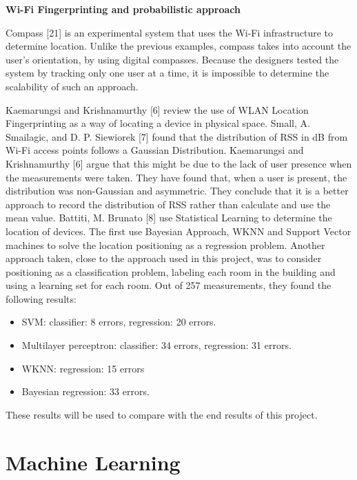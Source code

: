 \medskip
\noindent \textbf{Wi-Fi Fingerprinting and probabilistic approach}

Compass [21] is an experimental system that uses the Wi-Fi infrastructure to determine location. Unlike the previous examples, compass takes into account the user’s orientation, by using digital compasses. Because the designers tested the system by tracking only one user at a time, it is impossible to determine the scalability of such an approach.

Kaemarungsi and Krishnamurthy [6] review the use of WLAN Location Fingerprinting as a way of locating a device in physical space. Small, A. Smailagic, and D. P. Siewiorek [7] found that the distribution of RSS in dB from Wi-Fi access points follows a Gaussian Distribution. Kaemarungsi and Krishnamurthy [6] argue that this might be due to the lack of user presence when the measurements were taken. They have found that, when a user is present, the distribution was non-Gaussian and asymmetric. They conclude that it is a better approach to record the distribution of RSS rather than calculate and use the mean value. 
Battiti, M. Brunato [8] use Statistical Learning to determine the location of devices. The first use Bayesian Approach, WKNN and Support Vector machines to solve the location positioning as a regression problem. Another approach taken, close to the approach used in this project, was to consider positioning as a classification problem, labeling each room in the building and using a learning set for each room. Out of 257 measurements, they found the following results:
\begin{itemize}
\item SVM: classifier: 8 errors, regression: 20 errors.
\item Multilayer perceptron: classifier: 34 errors, regression: 31 errors.
\item WKNN: regression: 15 errors
\item Bayesian regression: 33 errors.
\end{itemize}
These results will be used to compare with the end results of this project.

\section{Machine Learning}

